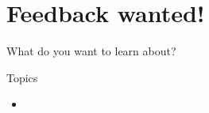 \documentclass[10pt]{beamer}\usepackage[]{graphicx}\usepackage[]{color}
\begin{document}

\section*{Feedback wanted!}

\begin{frame}{What do you want to learn about?}

\begin{alertblock}{Topics}
  \begin{itemize}
    \item 
  \end{itemize}
\end{alertblock}

\end{frame}
\end{document}
